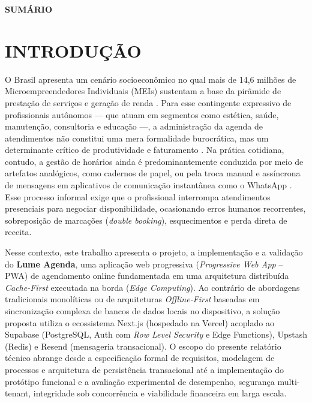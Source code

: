\documentclass[12pt,a4paper]{article}
\renewcommand{\contentsname}{SUMÁRIO}
\begin{document}
\newpage
\pagestyle{empty}

\centering
{ \textbf{SUMÁRIO} \par}
\vspace{0.8cm}
\justifying

\renewcommand{\contentsname}{}
\tableofcontents

\newpage
\pagestyle{plain} 
\onehalfspacing


\section{INTRODUÇÃO}
\label{sec:introducao}
\justifying

O Brasil apresenta um cenário socioeconômico no qual mais de 14,6 milhões de Microempreendedores Individuais (MEIs) sustentam a base da pirâmide de prestação de serviços e geração de renda \cite{ibge_noticias, ibge_educa_mei}. Para esse contingente expressivo de profissionais autônomos --- que atuam em segmentos como estética, saúde, manutenção, consultoria e educação ---, a administração da agenda de atendimentos não constitui uma mera formalidade burocrática, mas um determinante crítico de produtividade e faturamento \cite{sebrae_tempo, money_radar}. Na prática cotidiana, contudo, a gestão de horários ainda é predominantemente conduzida por meio de artefatos analógicos, como cadernos de papel, ou pela troca manual e assíncrona de mensagens em aplicativos de comunicação instantânea como o WhatsApp \cite{simples_agenda, agendor_whatsapp, gov_mapa_empresas}. Esse processo informal exige que o profissional interrompa atendimentos presenciais para negociar disponibilidade, ocasionando erros humanos recorrentes, sobreposição de marcações (\textit{double booking}), esquecimentos e perda direta de receita.

Nesse contexto, este trabalho apresenta o projeto, a implementação e a validação do \textbf{Lume Agenda}, uma aplicação web progressiva (\textit{Progressive Web App} -- PWA) de agendamento online fundamentada em uma arquitetura distribuída \textit{Cache-First} executada na borda (\textit{Edge Computing}). Ao contrário de abordagens tradicionais monolíticas ou de arquiteturas \textit{Offline-First} baseadas em sincronização complexa de bancos de dados locais no dispositivo, a solução proposta utiliza o ecossistema Next.js (hospedado na Vercel) acoplado ao Supabase (PostgreSQL, Auth com \textit{Row Level Security} e Edge Functions), Upstash (Redis) e Resend (mensageria transacional). O escopo do presente relatório técnico abrange desde a especificação formal de requisitos, modelagem de processos e arquitetura de persistência transacional até a implementação do protótipo funcional e a avaliação experimental de desempenho, segurança multi-tenant, integridade sob concorrência e viabilidade financeira em larga escala.
\end{document}
